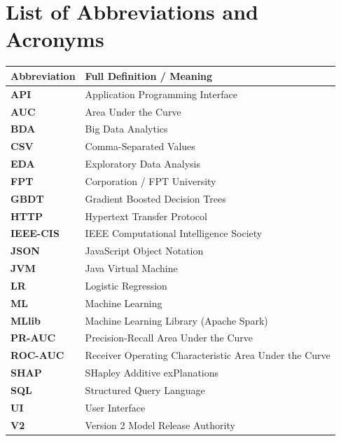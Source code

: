 \chapter*{List of Abbreviations and Acronyms}

\begin{table}[H]
\centering
\small
{}
\begin{tabularx}{\textwidth}{l X}
\toprule
\textbf{Abbreviation} & \textbf{Full Definition / Meaning}\\
\midrule
\textbf{API} & Application Programming Interface\\
\textbf{AUC} & Area Under the Curve\\
\textbf{BDA} & Big Data Analytics\\
\textbf{CSV} & Comma-Separated Values\\
\textbf{EDA} & Exploratory Data Analysis\\
\textbf{FPT} & Corporation / FPT University\\
\textbf{GBDT} & Gradient Boosted Decision Trees\\
\textbf{HTTP} & Hypertext Transfer Protocol\\
\textbf{IEEE-CIS} & IEEE Computational Intelligence Society\\
\textbf{JSON} & JavaScript Object Notation\\
\textbf{JVM} & Java Virtual Machine\\
\textbf{LR} & Logistic Regression\\
\textbf{ML} & Machine Learning\\
\textbf{MLlib} & Machine Learning Library (Apache Spark)\\
\textbf{PR-AUC} & Precision-Recall Area Under the Curve\\
\textbf{ROC-AUC} & Receiver Operating Characteristic Area Under the Curve\\
\textbf{SHAP} & SHapley Additive exPlanations\\
\textbf{SQL} & Structured Query Language\\
\textbf{UI} & User Interface\\
\textbf{V2} & Version 2 Model Release Authority\\
\bottomrule
\end{tabularx}
\end{table}

